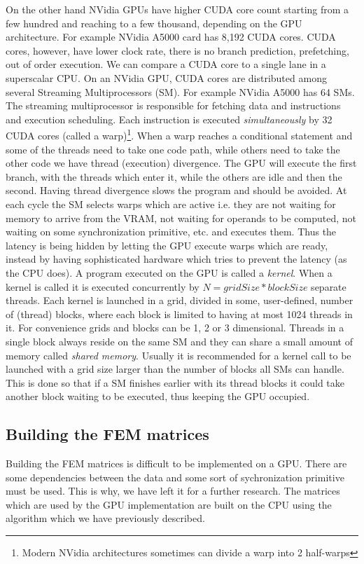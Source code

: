 On the other hand NVidia GPUs have higher CUDA core count starting from a few hundred and reaching to a few thousand, depending on the GPU architecture. For example NVidia A5000 card has 8,192 CUDA cores. CUDA cores, however, have lower clock rate, there is no branch prediction, prefetching, out of order execution. We can compare a CUDA core to a single lane in a superscalar CPU. On an NVidia GPU, CUDA cores are distributed among several Streaming Multiprocessors (SM). For example NVidia A5000 has 64 SMs. The streaming multiprocessor is responsible for fetching data and instructions and execution scheduling. Each instruction is executed \textit{simultaneously} by 32 CUDA cores (called a warp)\footnote{Modern NVidia architectures sometimes can divide a warp into 2 half-warps}. When a warp reaches a conditional statement and some of the threads need to take one code path, while others need to take the other code we have thread (execution) divergence. The GPU will execute the first branch, with the threads which enter it, while the others are idle and then the second. Having thread divergence slows the program and should be avoided. At each cycle the SM selects warps which are active i.e. they are not waiting for memory to arrive from the VRAM, not waiting for operands to be computed, not waiting on some synchronization primitive, etc. and executes them. Thus the latency is being hidden by letting the GPU execute warps which are ready, instead by having sophisticated hardware which tries to prevent the latency (as the CPU does). A program executed on the GPU is called a \textit{kernel}. When a kernel is called it is executed concurrently by $N = gridSize * blockSize$ separate threads. Each kernel is launched in a grid, divided in some, user-defined, number of (thread) blocks, where each block is limited to having at most 1024 threads in it. For convenience grids and blocks can be 1, 2 or 3 dimensional. Threads in a single block always reside on the same SM and they can share a small amount of memory called \textit{shared memory}. Usually it is recommended for a kernel call to be launched with a grid size larger than the number of blocks all SMs can handle. This is done so that if a SM finishes earlier with its thread blocks it could take another block waiting to be executed, thus keeping the GPU occupied.
\subsection{Building the FEM matrices}
Building the FEM matrices is difficult to be implemented on a GPU. There are some dependencies between the data and some sort of sychronization primitive must be used. This is why, we have left it for a further research. The matrices which are used by the GPU implementation are built on the CPU using the algorithm which we have previously described.
